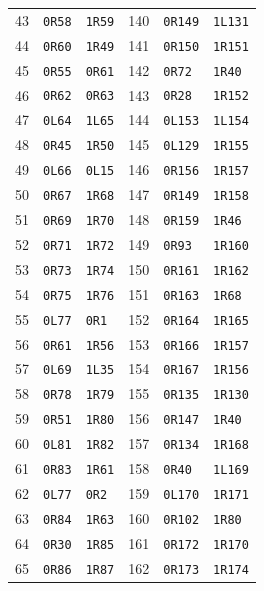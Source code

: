 \begin{longtable}{@{}rll@{\hspace{1.6cm}}rll@{}}
43 & \texttt{0R58} & \texttt{1R59} & 140 & \texttt{0R149} & \texttt{1L131} \\
44 & \texttt{0R60} & \texttt{1R49} & 141 & \texttt{0R150} & \texttt{1R151} \\
45 & \texttt{0R55} & \texttt{0R61} & 142 & \texttt{0R72} & \texttt{1R40} \\
46 & \texttt{0R62} & \texttt{0R63} & 143 & \texttt{0R28} & \texttt{1R152} \\
47 & \texttt{0L64} & \texttt{1L65} & 144 & \texttt{0L153} & \texttt{1L154} \\
48 & \texttt{0R45} & \texttt{1R50} & 145 & \texttt{0L129} & \texttt{1R155} \\
49 & \texttt{0L66} & \texttt{0L15} & 146 & \texttt{0R156} & \texttt{1R157} \\
50 & \texttt{0R67} & \texttt{1R68} & 147 & \texttt{0R149} & \texttt{1R158} \\
51 & \texttt{0R69} & \texttt{1R70} & 148 & \texttt{0R159} & \texttt{1R46} \\
52 & \texttt{0R71} & \texttt{1R72} & 149 & \texttt{0R93} & \texttt{1R160} \\
53 & \texttt{0R73} & \texttt{1R74} & 150 & \texttt{0R161} & \texttt{1R162} \\
54 & \texttt{0R75} & \texttt{1R76} & 151 & \texttt{0R163} & \texttt{1R68} \\
55 & \texttt{0L77} & \texttt{0R1} & 152 & \texttt{0R164} & \texttt{1R165} \\
56 & \texttt{0R61} & \texttt{1R56} & 153 & \texttt{0R166} & \texttt{1R157} \\
57 & \texttt{0L69} & \texttt{1L35} & 154 & \texttt{0R167} & \texttt{1R156} \\
58 & \texttt{0R78} & \texttt{1R79} & 155 & \texttt{0R135} & \texttt{1R130} \\
59 & \texttt{0R51} & \texttt{1R80} & 156 & \texttt{0R147} & \texttt{1R40} \\
60 & \texttt{0L81} & \texttt{1R82} & 157 & \texttt{0R134} & \texttt{1R168} \\
61 & \texttt{0R83} & \texttt{1R61} & 158 & \texttt{0R40} & \texttt{1L169} \\
62 & \texttt{0L77} & \texttt{0R2} & 159 & \texttt{0L170} & \texttt{1R171} \\
63 & \texttt{0R84} & \texttt{1R63} & 160 & \texttt{0R102} & \texttt{1R80} \\
64 & \texttt{0R30} & \texttt{1R85} & 161 & \texttt{0R172} & \texttt{1R170} \\
65 & \texttt{0R86} & \texttt{1R87} & 162 & \texttt{0R173} & \texttt{1R174} \\

\end{longtable}
